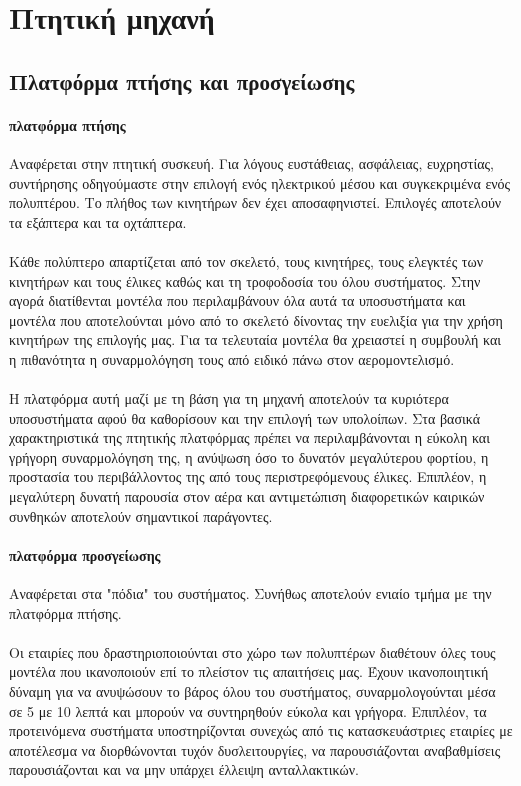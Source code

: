 \documentclass[a4paper, 12pt, twoside]{report}
\begin{document}
{{{{{{		
		\section{Πτητική μηχανή}
		\subsection{Πλατφόρμα πτήσης και προσγείωσης}
			\paragraph{πλατφόρμα πτήσης}{Αναφέρεται στην πτητική συσκευή. Για λόγους ευστάθειας, ασφάλειας, ευχρηστίας, συντήρησης οδηγούμαστε στην επιλογή ενός ηλεκτρικού μέσου και συγκεκριμένα ενός πολυπτέρου. Το πλήθος των κινητήρων δεν έχει αποσαφηνιστεί. Επιλογές αποτελούν τα εξάπτερα και τα οχτάπτερα.
			}
			\paragraph{}{Κάθε πολύπτερο απαρτίζεται από τον σκελετό, τους κινητήρες, τους ελεγκτές των κινητήρων και τους έλικες καθώς και τη τροφοδοσία του όλου συστήματος. Στην αγορά διατίθενται μοντέλα που περιλαμβάνουν όλα αυτά τα υποσυστήματα και μοντέλα που αποτελούνται μόνο από το σκελετό δίνοντας την ευελιξία για την χρήση κινητήρων της επιλογής μας. Για τα τελευταία μοντέλα θα χρειαστεί η συμβουλή και η πιθανότητα η συναρμολόγηση τους από ειδικό πάνω στον αερομοντελισμό.
			}
			\paragraph{}{Η πλατφόρμα αυτή μαζί με τη βάση για τη μηχανή αποτελούν τα κυριότερα υποσυστήματα αφού θα καθορίσουν και την επιλογή των υπολοίπων. Στα βασικά χαρακτηριστικά της πτητικής πλατφόρμας πρέπει να περιλαμβάνονται η εύκολη και γρήγορη συναρμολόγηση της, η ανύψωση όσο το δυνατόν μεγαλύτερου φορτίου, η προστασία του περιβάλλοντος της από τους περιστρεφόμενους έλικες. Επιπλέον, η μεγαλύτερη δυνατή παρουσία στον αέρα και αντιμετώπιση διαφορετικών καιρικών συνθηκών αποτελούν σημαντικοί παράγοντες.
			}			
			\paragraph{πλατφόρμα προσγείωσης}{Αναφέρεται στα "πόδια" του συστήματος. Συνήθως αποτελούν ενιαίο τμήμα με την πλατφόρμα πτήσης.
			}
			\paragraph{}{Οι εταιρίες που δραστηριοποιούνται στο χώρο των πολυπτέρων διαθέτουν όλες τους μοντέλα που ικανοποιούν επί το πλείστον τις απαιτήσεις μας. Έχουν ικανοποιητική δύναμη για να ανυψώσουν το βάρος όλου του συστήματος, συναρμολογούνται μέσα σε 5 με 10 λεπτά και μπορούν να συντηρηθούν εύκολα και γρήγορα. Επιπλέον, τα προτεινόμενα συστήματα υποστηρίζονται συνεχώς από τις κατασκευάστριες εταιρίες με αποτέλεσμα να διορθώνονται τυχόν δυσλειτουργίες, να παρουσιάζονται αναβαθμίσεις παρουσιάζονται και να μην υπάρχει έλλειψη ανταλλακτικών.
			}
}}}}}}
\end{document}
